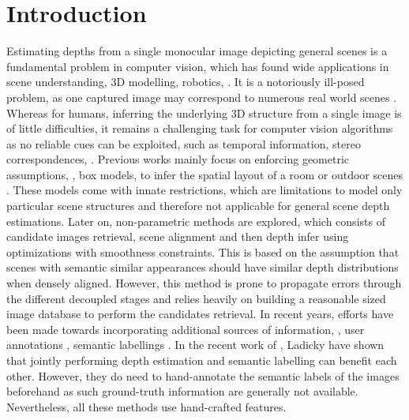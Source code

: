 \section{Introduction}
Estimating depths from a single monocular image depicting general scenes is a fundamental problem in computer vision, which has found wide applications in scene understanding, 3D modelling, robotics, \etc.  
It is a notoriously ill-posed problem, as one captured image may correspond to numerous real world scenes \cite{dcnn_nips14}.
Whereas for humans, inferring the underlying 3D structure from a single image is of little difficulties, it remains a challenging task for computer vision algorithms as no reliable cues can be exploited, such as temporal information, stereo correspondences, \etc. 
Previous works mainly focus on enforcing geometric assumptions, \eg, box models, to infer the spatial layout of a room \cite{Hedau_eccv10,Lee_nips10} or outdoor scenes \cite{Gupta_eccv10}.  
These models come with innate restrictions, which are limitations  to model only particular scene structures and therefore not applicable for general scene depth estimations. 
Later on, non-parametric methods \cite{depthTransfer_pami14} are explored, which consists of candidate images retrieval, scene alignment  and then depth infer using optimizations with smoothness constraints.
%
This is based on the assumption that scenes with semantic similar appearances should have similar depth distributions when densely aligned.
However, this method is prone to propagate errors through the different decoupled stages and relies heavily on building a reasonable sized image database to perform the candidates retrieval.
In recent years, efforts have been made towards incorporating additional sources of information, \eg, user annotations \cite{Russell_cvpr09}, semantic labellings \cite{Liu_cvpr12, Ladicky_cvpr14}. 
In the recent work of \cite{Ladicky_cvpr14}, Ladicky \etal have shown that jointly performing depth estimation and semantic labelling can benefit each other.
However, they do need to hand-annotate the semantic labels of the images beforehand as such ground-truth information are generally not available.
Nevertheless, all these methods use hand-crafted features.   

 

